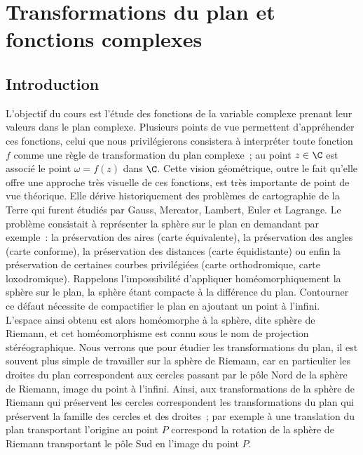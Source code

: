 \chapter{Transformations du plan et fonctions complexes}


\section{Introduction}

L'objectif du cours est l'étude des fonctions de la variable complexe  prenant leur valeurs dans le plan complexe. Plusieurs points de vue permettent d'appréhender ces fonctions, celui que nous privilégierons consistera à interpréter toute fonction $f$ comme une règle de transformation du plan complexe~; au point $z \in \C$ est associé le point $\omega=f(z)$ dans $\C$. Cette vision géométrique, outre le fait qu'elle offre une approche très visuelle de ces fonctions, est très importante de point de vue théorique. Elle dérive historiquement des problèmes de cartographie de la Terre qui furent étudiés par Gauss, Mercator, Lambert, Euler et Lagrange. Le problème consistait à représenter la sphère sur le plan en demandant par exemple~: la préservation des aires (carte équivalente), la préservation des angles (carte conforme), la préservation des distances (carte équidistante) ou enfin la préservation de certaines courbes privilégiées (carte orthodromique, carte loxodromique). Rappelons l'impossibilité d'appliquer homéomorphiquement la sphère sur le plan, la sphère étant compacte à la différence du plan. Contourner ce défaut nécessite de compactifier le plan en ajoutant un point à l'infini. L'espace ainsi obtenu est alors homéomorphe à la sphère, dite sphère de Riemann, et cet homéomorphisme est connu sous le nom de projection stéréographique. Nous verrons que pour étudier les transformations du plan, il est souvent plus simple de travailler sur la sphère de Riemann, car en particulier les droites du plan correspondent aux cercles passant par le pôle Nord de la sphère de Riemann, image du point à l'infini. Ainsi, aux transformations de la sphère de Riemann qui préservent les cercles correspondent les transformations du plan qui préservent la famille des cercles et des droites~; par exemple à une translation du plan transportant l'origine au point $P$ correspond la rotation de la sphère de Riemann transportant le pôle Sud en l'image du point $P$.   



